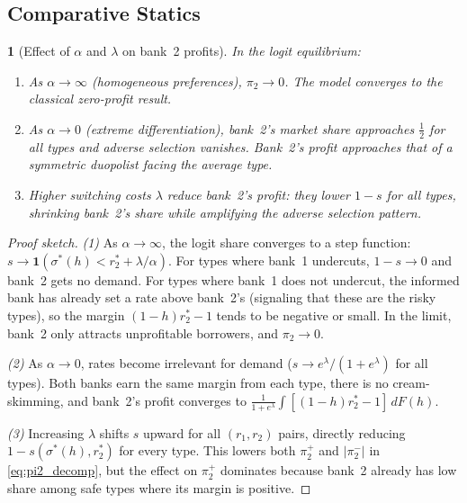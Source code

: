 \documentclass[12pt]{article}
\theoremstyle{plain}
\theoremstyle{plain}
\newtheorem{prop}[thm]{\protect\propositionname}
\theoremstyle{definition}  %
\theoremstyle{remark}  %
\providecommand{\propositionname}{Proposition}
\begin{document}
\subsection{Comparative Statics}

\begin{prop}[Effect of $\alpha$ and $\lambda$ on bank~2 profits]\label{prop:b2compstat}
In the logit equilibrium:
\begin{enumerate}
    \item As $\alpha \to \infty$ (homogeneous preferences), $\pi_2 \to 0$. The model converges to the classical zero-profit result.
    \item As $\alpha \to 0$ (extreme differentiation), bank~2's market share approaches $\frac{1}{2}$ for all types and adverse selection vanishes. Bank~2's profit approaches that of a symmetric duopolist facing the average type.
    \item Higher switching costs $\lambda$ reduce bank~2's profit: they lower $1-s$ for all types, shrinking bank~2's share while amplifying the adverse selection pattern.
\end{enumerate}
\end{prop}

\begin{proof}[Proof sketch]
\emph{(1)} As $\alpha \to \infty$, the logit share converges to a step function: $s \to \mathbf{1}(\sigma^*(h) < r_2^* + \lambda/\alpha)$. For types where bank~1 undercuts, $1-s \to 0$ and bank~2 gets no demand. For types where bank~1 does not undercut, the informed bank has already set a rate above bank~2's (signaling that these are the risky types), so the margin $(1-h)r_2^* - 1$ tends to be negative or small. In the limit, bank~2 only attracts unprofitable borrowers, and $\pi_2 \to 0$.

\emph{(2)} As $\alpha \to 0$, rates become irrelevant for demand ($s \to e^{\lambda}/(1+e^{\lambda})$ for all types). Both banks earn the same margin from each type, there is no cream-skimming, and bank~2's profit converges to $\frac{1}{1+e^{\lambda}} \int [(1-h)r_2^* - 1]\, dF(h)$.

\emph{(3)} Increasing $\lambda$ shifts $s$ upward for all $(r_1, r_2)$ pairs, directly reducing $1-s(\sigma^*(h), r_2^*)$ for every type. This lowers both $\pi_2^+$ and $|\pi_2^-|$ in \eqref{eq:pi2_decomp}, but the effect on $\pi_2^+$ dominates because bank~2 already has low share among safe types where its margin is positive.
\end{proof}
\end{document}
